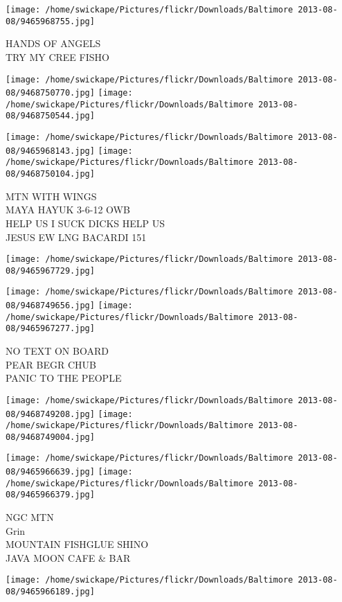 \documentclass[10pt,letterpaper]{article}
\begin{document}
\vspace{0.25in}
\texttt{[image: /home/swickape/Pictures/flickr/Downloads/Baltimore 2013-08-08/9465968755.jpg]}

HANDS OF ANGELS\\
TRY MY CREE FISHO
\pagebreak

\texttt{[image: /home/swickape/Pictures/flickr/Downloads/Baltimore 2013-08-08/9468750770.jpg]}
\texttt{[image: /home/swickape/Pictures/flickr/Downloads/Baltimore 2013-08-08/9468750544.jpg]}

\texttt{[image: /home/swickape/Pictures/flickr/Downloads/Baltimore 2013-08-08/9465968143.jpg]}
\texttt{[image: /home/swickape/Pictures/flickr/Downloads/Baltimore 2013-08-08/9468750104.jpg]}

MTN WITH WINGS\\
MAYA HAYUK 3{-}6{-}12 OWB\\
HELP US I SUCK DICKS HELP US\\
JESUS EW LNG BACARDI 151
\pagebreak

\texttt{[image: /home/swickape/Pictures/flickr/Downloads/Baltimore 2013-08-08/9465967729.jpg]}

\vspace{0.25in}
\texttt{[image: /home/swickape/Pictures/flickr/Downloads/Baltimore 2013-08-08/9468749656.jpg]}
\texttt{[image: /home/swickape/Pictures/flickr/Downloads/Baltimore 2013-08-08/9465967277.jpg]}

NO TEXT ON BOARD\\
PEAR BEGR CHUB\\
PANIC TO THE PEOPLE
\pagebreak

\texttt{[image: /home/swickape/Pictures/flickr/Downloads/Baltimore 2013-08-08/9468749208.jpg]}
\texttt{[image: /home/swickape/Pictures/flickr/Downloads/Baltimore 2013-08-08/9468749004.jpg]}

\texttt{[image: /home/swickape/Pictures/flickr/Downloads/Baltimore 2013-08-08/9465966639.jpg]}
\texttt{[image: /home/swickape/Pictures/flickr/Downloads/Baltimore 2013-08-08/9465966379.jpg]}

NGC MTN\\
Grin\\
MOUNTAIN FISHGLUE SHINO\\
JAVA MOON CAFE \& BAR
\pagebreak

\texttt{[image: /home/swickape/Pictures/flickr/Downloads/Baltimore 2013-08-08/9465966189.jpg]}
\end{document}
